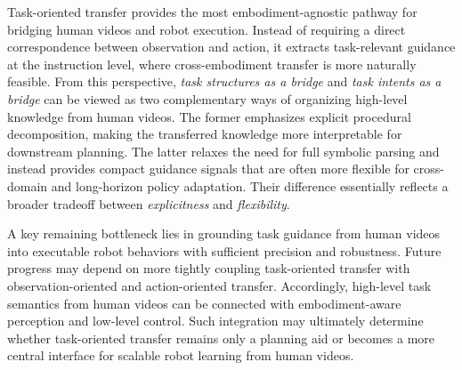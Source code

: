 \documentclass[Afour,sageh,times]{sagej}
\begin{document}
Task-oriented transfer provides the most embodiment-agnostic pathway for bridging human videos and robot execution. Instead of requiring a direct correspondence between observation and action, it extracts task-relevant guidance at the instruction level, where cross-embodiment transfer is more naturally feasible. From this perspective, \textit{task structures as a bridge} and \textit{task intents as a bridge} can be viewed as two complementary ways of organizing high-level knowledge from human videos. The former emphasizes explicit procedural decomposition, making the transferred knowledge more interpretable for downstream planning. The latter relaxes the need for full symbolic parsing and instead provides compact guidance signals that are often more flexible for cross-domain and long-horizon policy adaptation. Their difference essentially reflects a broader tradeoff between \textit{explicitness} and \textit{flexibility}. 

A key remaining bottleneck lies in grounding task guidance from human videos into executable robot behaviors with sufficient precision and robustness. Future progress may depend on more tightly coupling task-oriented transfer with observation-oriented and action-oriented transfer. Accordingly, high-level task semantics from human videos can be connected with embodiment-aware perception and low-level control. Such integration may ultimately determine whether task-oriented transfer remains only a planning aid or becomes a more central interface for scalable robot learning from human videos.
\end{document}
